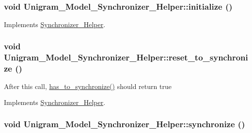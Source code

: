 \hypertarget{class_unigram___model___synchronizer___helper_aa1f5e5b097ff5f089dde9b34dd2fae3e}{
\subsubsection[{initialize}]{\setlength{\rightskip}{0pt plus 5cm}void Unigram\_\-Model\_\-Synchronizer\_\-Helper::initialize ()}}
\label{class_unigram___model___synchronizer___helper_aa1f5e5b097ff5f089dde9b34dd2fae3e}


Implements \hyperlink{class_synchronizer___helper_a7732654b0b1f02ba661e520564a690b8}{Synchronizer\_\-Helper}.

\hypertarget{class_unigram___model___synchronizer___helper_a3e9fef7c7c827ced4ec473e99c2c2ba0}{
\subsubsection[{reset\_\-to\_\-synchronize}]{\setlength{\rightskip}{0pt plus 5cm}void Unigram\_\-Model\_\-Synchronizer\_\-Helper::reset\_\-to\_\-synchronize ()}}
\label{class_unigram___model___synchronizer___helper_a3e9fef7c7c827ced4ec473e99c2c2ba0}
After this call, \hyperlink{class_unigram___model___synchronizer___helper_ac07d07668ba79d9748d2f52629ccf50e}{has\_\-to\_\-synchronize()} should return true 

Implements \hyperlink{class_synchronizer___helper_ac58a4f287d5edd1fa6883701567da75a}{Synchronizer\_\-Helper}.

\hypertarget{class_unigram___model___synchronizer___helper_a270835ef882ab219a7f9ffe6000627e7}{
\subsubsection[{synchronize}]{\setlength{\rightskip}{0pt plus 5cm}void Unigram\_\-Model\_\-Synchronizer\_\-Helper::synchronize ()}}
\label{class_unigram___model___synchronizer___helper_a270835ef882ab219a7f9ffe6000627e7}


